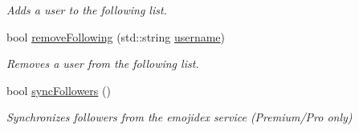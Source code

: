 \begin{DoxyCompactItemize}
\begin{DoxyCompactList}\small\item\em Adds a user to the following list. \end{DoxyCompactList}\item 
bool \hyperlink{classEmojidex_1_1Service_1_1User_a42f548583cb236e22278754c863ea6c6}{remove\+Following} (std\+::string \hyperlink{classEmojidex_1_1Service_1_1User_a5bb9d033735aa9f82fa666f811f48743}{username})\hypertarget{classEmojidex_1_1Service_1_1User_a42f548583cb236e22278754c863ea6c6}{}\label{classEmojidex_1_1Service_1_1User_a42f548583cb236e22278754c863ea6c6}

\begin{DoxyCompactList}\small\item\em Removes a user from the following list. \end{DoxyCompactList}\item 
bool \hyperlink{classEmojidex_1_1Service_1_1User_ac9d62c8a7fd9eb6e64e930460e9f98d3}{sync\+Followers} ()\hypertarget{classEmojidex_1_1Service_1_1User_ac9d62c8a7fd9eb6e64e930460e9f98d3}{}\label{classEmojidex_1_1Service_1_1User_ac9d62c8a7fd9eb6e64e930460e9f98d3}

\begin{DoxyCompactList}\small\item\em Synchronizes followers from the emojidex service (Premium/\+Pro only) \end{DoxyCompactList}\end{DoxyCompactItemize}

